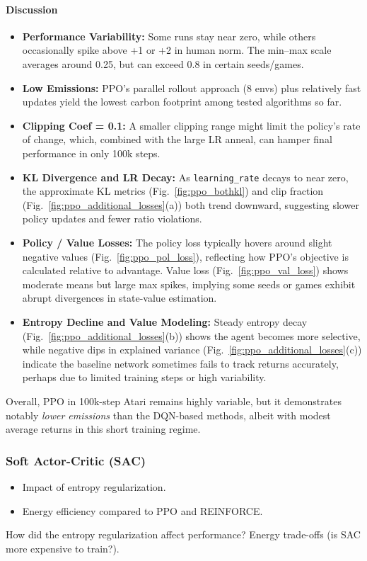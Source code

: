 \paragraph{Discussion}
\begin{itemize}
	\item \textbf{Performance Variability:} 
	Some runs stay near zero, while others occasionally spike above +1 or +2 in human norm. 
	The min--max scale averages around 0.25, but can exceed 0.8 in certain seeds/games.
	\item \textbf{Low Emissions:} 
	PPO’s parallel rollout approach (8 envs) plus relatively fast updates 
	yield the lowest carbon footprint among tested algorithms so far.
	\item \textbf{Clipping Coef = 0.1:} 
	A smaller clipping range might limit the policy’s rate of change, 
	which, combined with the large LR anneal, can hamper final performance in only 100k steps.
	\item \textbf{KL Divergence and LR Decay:} 
	As \texttt{learning\_rate} decays to near zero, 
	the approximate KL metrics (Fig.~\ref{fig:ppo_bothkl}) 
	and clip fraction (Fig.~\ref{fig:ppo_additional_losses}(a)) both trend downward, 
	suggesting slower policy updates and fewer ratio violations.
	\item \textbf{Policy / Value Losses:} 
	The policy loss typically hovers around slight negative values (Fig.~\ref{fig:ppo_pol_loss}), 
	reflecting how PPO’s objective is calculated relative to advantage. 
	Value loss (Fig.~\ref{fig:ppo_val_loss}) shows moderate means but large max spikes, 
	implying some seeds or games exhibit abrupt divergences in state-value estimation.
	\item \textbf{Entropy Decline and Value Modeling:} 
	Steady entropy decay (Fig.~\ref{fig:ppo_additional_losses}(b)) shows the agent becomes more selective, 
	while negative dips in explained variance (Fig.~\ref{fig:ppo_additional_losses}(c)) 
	indicate the baseline network sometimes fails to track returns accurately, 
	perhaps due to limited training steps or high variability.
\end{itemize}

Overall, PPO in 100k-step Atari remains highly variable, but it demonstrates 
notably \emph{lower emissions} than the DQN-based methods, 
albeit with modest average returns in this short training regime.


\subsubsection{Soft Actor-Critic (SAC)}
\label{subsubsec:sac}
\begin{itemize}
	\item Impact of entropy regularization.
	\item Energy efficiency compared to PPO and REINFORCE.
\end{itemize}
How did the entropy regularization affect performance?
Energy trade-offs (is SAC more expensive to train?).


